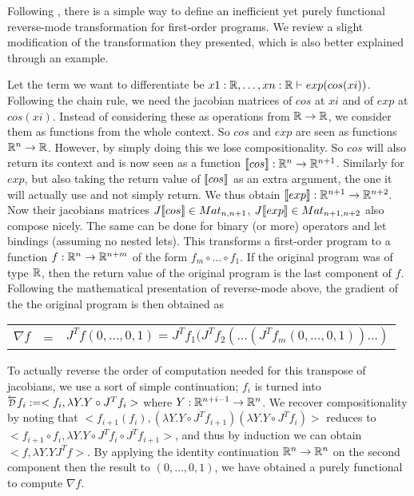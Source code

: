 Following \cite{pearlmutter2008reverse}, there is a simple way to define an inefficient yet purely functional reverse-mode transformation for first-order programs.
We review a slight modification of the transformation they presented, which is also better explained through an example. 

Let the term we want to differentiate be $x1:\mathbb{R},\ldots,xn:\mathbb{R}\vdash exp(cos(xi))$.
Following the chain rule, we need the jacobian matrices of $cos$ at $xi$ and of $exp$ at $cos(xi)$. 
Instead of considering these as operations from $\mathbb{R}\to\mathbb{R}$, we consider them as functions from the whole context. So $cos$ and $exp$ are seen as functions $\mathbb{R}^n\to\mathbb{R}$.
However, by simply doing this we lose compositionality. 
So $cos$ will also return its context and is now seen as a function $\llbracket cos\rrbracket:\mathbb{R}^n\to\mathbb{R}^{n+1}$.
Similarly for $exp$, but also taking the return value of $\llbracket cos\rrbracket$ as an extra argument, the one it will actually use and not simply return. 
We thus obtain $\llbracket exp\rrbracket:\mathbb{R}^{n+1}\to\mathbb{R}^{n+2}$. Now their jacobians matrices $J\llbracket cos\rrbracket \in Mat_{n,n+1}$, $J\llbracket exp\rrbracket \in Mat_{n+1,n+2}$ also compose nicely.
The same can be done for binary (or more) operators and let bindings (assuming no nested lets). 
This transforms a first-order program to a function $f:\mathbb{R}^n\to\mathbb{R}^{n+m}$ of the form $f_m\circ\ldots\circ f_1$. 
If the original program was of type $\mathbb{R}$, then the return value of the original program is the last component of $f$.
Following the mathematical presentation of reverse-mode above, the gradient of the the original program is then obtained as 
\begin{center}
    \begin{tabular}{r c l}
        $\nabla f$ &=& $J^Tf(0,\ldots,0,1)=J^Tf_1(J^Tf_{2}(\ldots(J^Tf_m(0,\ldots,0,1))\ldots)$
    \end{tabular}
\end{center}

To actually reverse the order of computation needed for this transpose of jacobians, we use a sort of simple continuation;
$f_i$ is turned into $\Dsynrevsymbol{f_i}:=<f_i, \lambda Y. Y\circ J^Tf_i>$ where $Y:\mathbb{R}^{n+i-1}\to \mathbb{R}^n$. 
We recover compositionality by noting that $<f_{i+1}(f_i), (\lambda Y. Y\circ J^Tf_{i+1})(\lambda Y. Y\circ J^Tf_i)>$ reduces to
$<f_{i+1}\circ f_i, \lambda Y. Y\circ J^Tf_i \circ J^Tf_{i+1}>$, and thus by induction we can obtain $<f, \lambda Y. YJ^Tf>$.
By applying the identity continuation $\mathbb{R}^n\to\mathbb{R}^n$ on the second component then the result to $(0,\ldots,0,1)$, 
we have obtained a purely functional to compute $\nabla f$. 

